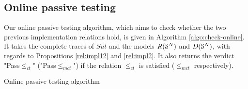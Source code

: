 \subsection{Online passive testing}
\label{sec:testing:online}

Our online passive testing algorithm, which aims to check whether
the two previous implementation relations hold, is given in
Algorithm \ref{algo:check-online}. It takes the complete traces
of $\mathit{Sut}$ and the models $R(\EuScript{S}^{N})$ and
$D(\EuScript{S}^{N})$, with regards to Propositions
\ref{rel:impl12} and \ref{rel:impl2}. It also returns the verdict
"Pass$\leq_{ct}$" ("Pass$\leq_{mct}$") if the relation
$\leq_{ct}$ is satisfied ($\leq_{mct}$ respectively).

\begin{algorithm}[h]


    \caption{Online passive testing algorithm}
    \label{algo:check-online}
\end{algorithm}
